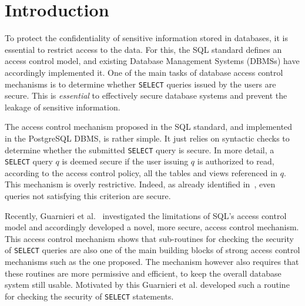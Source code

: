 \section{Introduction}
To protect the confidentiality of sensitive information stored in databases, it is essential to restrict access to the data.
%
For this, the SQL standard defines an access control model, and existing Database Management Systems (DBMSs) have accordingly implemented it. 
%
One of the main tasks of database access control mechanisms is to determine whether \texttt{SELECT} queries issued by the users are secure.
%
This is \emph{essential} to effectively secure database systems and prevent the leakage of sensitive information.

The access control mechanism proposed in the SQL standard, and implemented in the PostgreSQL DBMS, is rather simple.
%
It just relies on syntactic checks to determine whether the submitted \texttt{SELECT} query is secure.
%
In more detail, a \texttt{SELECT} query $q$ is deemed secure if the user issuing $q$ is authorized to read, according to the access control policy, all the tables and views referenced in $q$. %
%
This mechanism is overly restrictive.
%
Indeed, as already identified in~\cite{rizvi2004extending, guarnieri2014optimal, wang2007correctness,zhang2005authorizations}, even queries not satisfying this criterion are secure.

Recently, Guarnieri et al.~\cite{guarnieri2016strong} investigated the limitations of SQL's access control model and accordingly  developed a novel, more secure, access control mechanism.
%
This access control mechanism shows that sub-routines for checking the security of \texttt{SELECT} queries are also one of the main building blocks of strong access control mechanisms such as the one proposed.
%
The mechanism however also requires that these routines are more permissive and efficient, to keep the overall database system still usable.
%
Motivated by this Guarnieri et al. developed such a routine for checking the security of \texttt{SELECT} statements.


